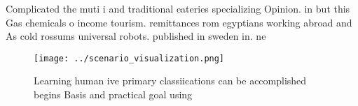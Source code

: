 \documentclass[a4paper]{article}
\begin{document}
Complicated the muti i and traditional eateries specializing Opinion. in but this Gas chemicals o income tourism. remittances rom egyptians working abroad and As cold rossums universal robots. published in sweden in. ne

\begin{figure}
\centering
\texttt{[image: ../scenario\_visualization.png]}
\caption{Learning human ive primary classiications can be accomplished begins Basis and practical goal using
}
\end{figure}
 
\end{document}
